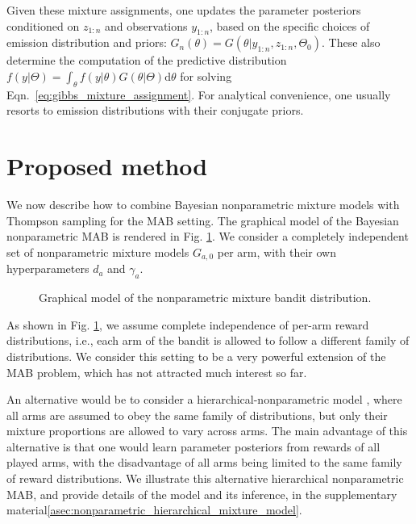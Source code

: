 \documentclass{article}
\newcommand{\ie}{i.e., }
\def\addappendix{}
\begin{document}
Given these mixture assignments, one updates the parameter posteriors conditioned on $z_{1:n}$ and observations $y_{1:n}$, based on the specific choices of emission distribution and priors: $G_n(\theta)=G(\theta|y_{1:n}, z_{1:n},\Theta_0)$. These also determine the computation of the predictive distribution $f(y|\Theta)= \int_{\theta} f(y|\theta) G(\theta|\Theta) \mathrm{d} \theta$ for solving Eqn.~\eqref{eq:gibbs_mixture_assignment}. For analytical convenience, one usually resorts to emission distributions with their conjugate priors.

\section{Proposed method}
\label{sec:proposed_method}

We now describe how to combine Bayesian nonparametric mixture models with Thompson sampling for the MAB setting. The graphical model of the Bayesian nonparametric MAB is rendered in Fig. \ref{fig:pgm_nonparametric_bandit}. We consider a completely independent set of nonparametric mixture models $G_{a,0}$ per arm, with their own hyperparameters $d_a$ and $\gamma_a$.

\begin{figure}[!h]
	\begin{center}
		
	\end{center}
	\caption{Graphical model of the nonparametric mixture bandit distribution.}
	\label{fig:pgm_nonparametric_bandit}
\end{figure}

As shown in Fig. \ref{fig:pgm_nonparametric_bandit}, we assume complete independence of per-arm reward distributions, \ie each arm of the bandit is allowed to follow a different family of distributions. We consider this setting to be a very powerful extension of the MAB problem, which has not attracted much interest so far.

An alternative would be to consider a hierarchical-nonparametric model \cite{j-Teh2006,j-Teh2010}, where all arms are assumed to obey the same family of distributions, but only their mixture proportions are allowed to vary across arms. The main advantage of this alternative is that one would learn parameter posteriors from rewards of all played arms, with the disadvantage of all arms being limited to the same family of reward distributions. We illustrate this alternative hierarchical nonparametric MAB, and provide details of the model and its inference, in \ifx\addappendix\undefined the supplementary material\else \autoref{asec:nonparametric_hierarchical_mixture_model}\fi.
\end{document}

